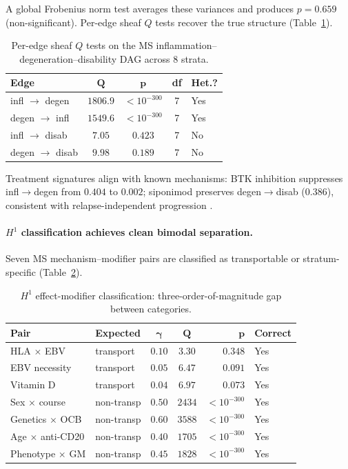 \documentclass{article}
\begin{document}
A global Frobenius norm test averages these variances and produces $p = 0.659$ (non-significant).
Per-edge sheaf $Q$ tests recover the true structure (Table~\ref{tab:dag}).

\begin{table}[t]
\centering
\caption{Per-edge sheaf $Q$ tests on the MS inflammation--degeneration--disability DAG across 8 strata.}
\label{tab:dag}
\small
\begin{tabular}{@{}lcccl@{}}
\toprule
\textbf{Edge} & $\boldsymbol{Q}$ & $\boldsymbol{p}$ & \textbf{df} & \textbf{Het.?} \\
\midrule
infl $\to$ degen & $1806.9$ & $< 10^{-300}$ & 7 & Yes \\
degen $\to$ infl & $1549.6$ & $< 10^{-300}$ & 7 & Yes \\
infl $\to$ disab & $7.05$ & $0.423$ & 7 & No \\
degen $\to$ disab & $9.98$ & $0.189$ & 7 & No \\
\bottomrule
\end{tabular}
\end{table}

Treatment signatures align with known mechanisms: BTK inhibition suppresses infl$\to$degen from $0.404$ to $0.002$; siponimod preserves degen$\to$disab ($0.386$), consistent with relapse-independent progression \citep{kappos2018siponimod}.

\paragraph{$H^1$ classification achieves clean bimodal separation.}
Seven MS mechanism--modifier pairs are classified as transportable or stratum-specific (Table~\ref{tab:h1}).

\begin{table}[t]
\centering
\caption{$H^1$ effect-modifier classification: three-order-of-magnitude gap between categories.}
\label{tab:h1}
\small
\begin{tabular}{@{}llccrl@{}}
\toprule
\textbf{Pair} & \textbf{Expected} & $\boldsymbol{\gamma}$ & $\boldsymbol{Q}$ & $\boldsymbol{p}$ & \textbf{Correct} \\
\midrule
HLA $\times$ EBV & transport & $0.10$ & $3.30$ & $0.348$ & Yes \\
EBV necessity & transport & $0.05$ & $6.47$ & $0.091$ & Yes \\
Vitamin D & transport & $0.04$ & $6.97$ & $0.073$ & Yes \\
\midrule
Sex $\times$ course & non-transp & $0.50$ & $2434$ & $< 10^{-300}$ & Yes \\
Genetics $\times$ OCB & non-transp & $0.60$ & $3588$ & $< 10^{-300}$ & Yes \\
Age $\times$ anti-CD20 & non-transp & $0.40$ & $1705$ & $< 10^{-300}$ & Yes \\
Phenotype $\times$ GM & non-transp & $0.45$ & $1828$ & $< 10^{-300}$ & Yes \\
\bottomrule
\end{tabular}
\end{table}
\end{document}
